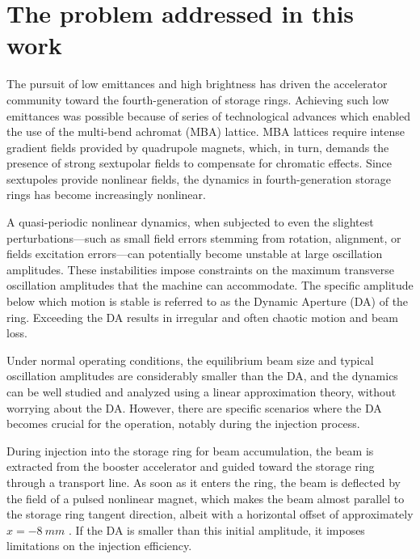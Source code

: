\section{The problem addressed in this work}
The pursuit of low emittances and high brightness has driven the accelerator community toward the fourth-generation of storage rings. Achieving such low emittances was possible because of series of technological advances which enabled the use of the multi-bend achromat (MBA) lattice\cite{liu_towards_2017,hettel_challenges_2014}. MBA lattices require intense gradient fields provided by quadrupole magnets, which, in turn, demands the presence of strong sextupolar fields to compensate for chromatic effects. Since sextupoles provide nonlinear fields, the dynamics in fourth-generation storage rings has become increasingly nonlinear\cite{liu_towards_2017}.

A quasi-periodic nonlinear dynamics, when subjected to even the slightest perturbations—such as small field errors stemming from rotation, alignment, or fields excitation errors—can potentially become unstable at large oscillation amplitudes. These instabilities impose constraints on the maximum transverse oscillation amplitudes that the machine can accommodate. The specific amplitude below which motion is stable is referred to as the Dynamic Aperture (DA) of the ring. Exceeding the DA results in irregular and often chaotic motion and beam loss.

Under normal operating conditions, the equilibrium beam size and typical oscillation amplitudes are considerably smaller than the DA, and the dynamics can be well studied and analyzed using a linear approximation theory, without worrying about the DA. However, there are specific scenarios where the DA becomes crucial for the operation, notably during the injection process.

During injection into the storage ring for beam accumulation, the beam is extracted from the booster accelerator and guided toward the storage ring through a transport line. As soon as it enters the ring, the beam is deflected by the field of a pulsed nonlinear magnet, which makes the beam almost parallel to the storage ring tangent direction, albeit with a horizontal offset of approximately $x=-8~\unit{mm}$ \cite{liu_injection_2016}. If the DA is smaller than this initial amplitude, it imposes limitations on the injection efficiency.

